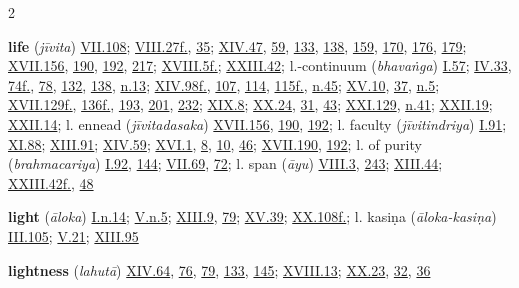 \begin{multicols}{2}
\begin{vismHanging}
\par\textbf{life} (\emph{jīvita}) \hyperlink{VII.108}{VII.108}{}; \hyperlink{VIII.27}{VIII.27f.}{}, \hyperlink{VIII.35}{35}{}; \hyperlink{XIV.47}{XIV.47}{}, \hyperlink{XIV.59}{59}{}, \hyperlink{XIV.133}{133}{}, \hyperlink{XIV.138}{138}{}, \hyperlink{XIV.159}{159}{}, \hyperlink{XIV.170}{170}{}, \hyperlink{XIV.176}{176}{}, \hyperlink{XIV.179}{179}{}; \hyperlink{XVII.156}{XVII.156}{}, \hyperlink{XVII.190}{190}{}, \hyperlink{XVII.192}{192}{}, \hyperlink{XVII.217}{217}{}; \hyperlink{XVIII.5}{XVIII.5f.}{}; \hyperlink{XXIII.42}{XXIII.42}{}; l.-continuum (\emph{bhavaṅga}) \hyperlink{I.57}{I.57}{}; \hyperlink{IV.33}{IV.33}{}, \hyperlink{IV.74}{74f.}{}, \hyperlink{IV.78}{78}{}, \hyperlink{IV.132}{132}{}, \hyperlink{IV.138}{138}{}, \hyperlink{IV.n13}{n.13}{}; \hyperlink{XIV.98}{XIV.98f.}{}, \hyperlink{XIV.107}{107}{}, \hyperlink{XIV.114}{114}{}, \hyperlink{XIV.115}{115f.}{}, \hyperlink{XIV.n45}{n.45}{}; \hyperlink{XV.10}{XV.10}{}, \hyperlink{XV.37}{37}{}, \hyperlink{XV.n5}{n.5}{}; \hyperlink{XVII.129}{XVII.129f.}{}, \hyperlink{XVII.136}{136f.}{}, \hyperlink{XVII.193}{193}{}, \hyperlink{XVII.201}{201}{}, \hyperlink{XVII.232}{232}{}; \hyperlink{XIX.8}{XIX.8}{}; \hyperlink{XX.24}{XX.24}{}, \hyperlink{XX.31}{31}{}, \hyperlink{XX.43}{43}{}; \hyperlink{XXI.129}{XXI.129}{}, \hyperlink{XXI.n41}{n.41}{}; \hyperlink{XXII.19}{XXII.19}{}; \hyperlink{XXII.14}{XXII.14}{}; l. ennead (\emph{jīvitadasaka}) \hyperlink{XVII.156}{XVII.156}{}, \hyperlink{XVII.190}{190}{}, \hyperlink{XVII.192}{192}{}; l. faculty (\emph{jīvitindriya}) \hyperlink{I.91}{I.91}{}; \hyperlink{XI.88}{XI.88}{}; \hyperlink{XIII.91}{XIII.91}{}; \hyperlink{XIV.59}{XIV.59}{}; \hyperlink{XVI.1}{XVI.1}{}, \hyperlink{XVI.8}{8}{}, \hyperlink{XVI.10}{10}{}, \hyperlink{XVI.46}{46}{}; \hyperlink{XVII.190}{XVII.190}{}, \hyperlink{XVII.192}{192}{}; l. of purity (\emph{brahmacariya}) \hyperlink{I.92}{I.92}{}, \hyperlink{I.144}{144}{}; \hyperlink{VII.69}{VII.69}{}, \hyperlink{VII.72}{72}{}; l. span (\emph{āyu}) \hyperlink{VIII.3}{VIII.3}{}, \hyperlink{VIII.243}{243}{}; \hyperlink{XIII.44}{XIII.44}{}; \hyperlink{XXIII.42}{XXIII.42f.}{}, \hyperlink{XXIII.48}{48}{}
\par\textbf{light} (\emph{āloka}) \hyperlink{I.n14}{I.n.14}{}; \hyperlink{V.n5}{V.n.5}{}; \hyperlink{XIII.9}{XIII.9}{}, \hyperlink{XIII.79}{79}{}; \hyperlink{XV.39}{XV.39}{}; \hyperlink{XX.108}{XX.108f.}{}; l. kasiṇa (\emph{āloka-kasiṇa}) \hyperlink{III.105}{III.105}{}; \hyperlink{V.21}{V.21}{}; \hyperlink{XIII.95}{XIII.95}{}
\par\textbf{lightness} (\emph{lahutā}) \hyperlink{XIV.64}{XIV.64}{}, \hyperlink{XIV.76}{76}{}, \hyperlink{XIV.79}{79}{}, \hyperlink{XIV.133}{133}{}, \hyperlink{XIV.145}{145}{}; \hyperlink{XVIII.13}{XVIII.13}{}; \hyperlink{XX.23}{XX.23}{}, \hyperlink{XX.32}{32}{}, \hyperlink{XX.36}{36}{}

\end{vismHanging}
\end{multicols}

